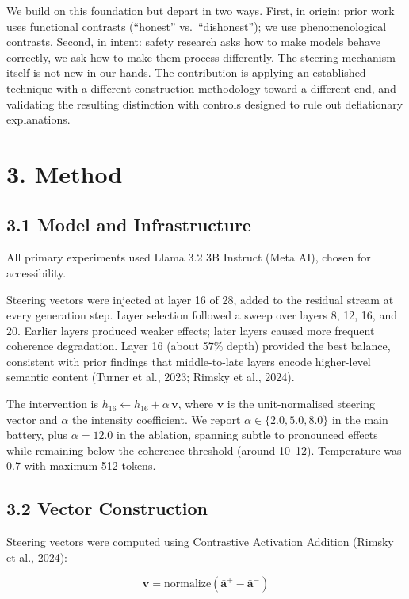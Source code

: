 \documentclass[11pt,a4paper]{article}
\begin{document}
We build on this foundation but depart in two ways. First, in origin: prior work uses functional contrasts (``honest'' vs.~``dishonest''); we use phenomenological contrasts. Second, in intent: safety research asks how to make models behave correctly, we ask how to make them process differently. The steering mechanism itself is not new in our hands. The contribution is applying an established technique with a different construction methodology toward a different end, and validating the resulting distinction with controls designed to rule out deflationary explanations.

\section*{3. Method}

\subsection*{3.1 Model and Infrastructure}

All primary experiments used Llama 3.2 3B Instruct (Meta AI), chosen for accessibility.

Steering vectors were injected at layer 16 of 28, added to the residual stream at every generation step. Layer selection followed a sweep over layers 8, 12, 16, and 20. Earlier layers produced weaker effects; later layers caused more frequent coherence degradation. Layer 16 (about 57\% depth) provided the best balance, consistent with prior findings that middle-to-late layers encode higher-level semantic content (Turner et al., 2023; Rimsky et al., 2024).

The intervention is \(h_{16} \leftarrow h_{16} + \alpha\,\mathbf{v}\), where \(\mathbf{v}\) is the unit-normalised steering vector and \(\alpha\) the intensity coefficient. We report \(\alpha \in \{2.0, 5.0, 8.0\}\) in the main battery, plus \(\alpha = 12.0\) in the ablation, spanning subtle to pronounced effects while remaining below the coherence threshold (around 10--12). Temperature was 0.7 with maximum 512 tokens.

\subsection*{3.2 Vector Construction}

Steering vectors were computed using Contrastive Activation Addition (Rimsky et al., 2024):

\[\mathbf{v} = \text{normalize}(\bar{\mathbf{a}}^{+} - \bar{\mathbf{a}}^{-})\]
\end{document}
